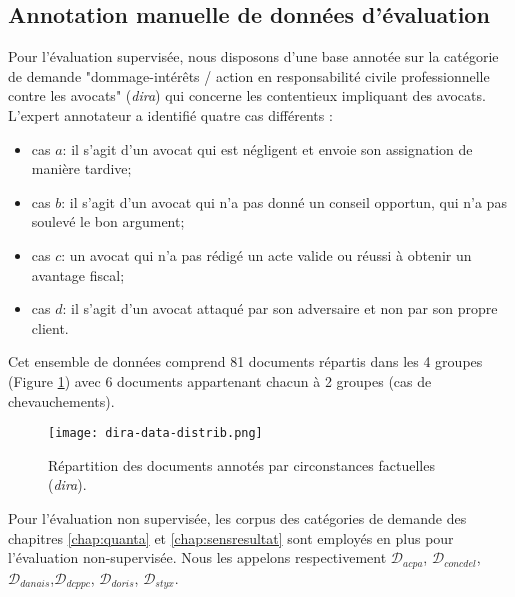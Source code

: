 \subsection{Annotation manuelle de données d'évaluation}
Pour l'évaluation supervisée, nous disposons d'une base annotée sur la catégorie de demande "dommage-intérêts / action en responsabilité civile professionnelle contre les avocats" (\textit{dira}) qui concerne les contentieux impliquant des avocats.  L'expert annotateur a identifié quatre cas différents :
\begin{itemize}
\item cas $a$: il s'agit d'un avocat qui est négligent et envoie son assignation de manière tardive; %
\item cas $b$: il s'agit d'un avocat qui n'a pas donné un conseil opportun, qui n'a pas soulevé le bon argument;
\item cas $c$: un avocat qui n'a pas rédigé un acte valide ou réussi à obtenir un avantage fiscal; %
\item cas $d$: il s'agit d'un avocat attaqué par son adversaire et non par son propre client.
\end{itemize}

Cet ensemble de données comprend 81 documents répartis dans les 4 groupes (Figure \ref{fig:similarite:dira-data-distrib}) avec 6 documents appartenant chacun à 2 groupes (cas de chevauchements).

\begin{figure}[!htb]
	\centering \texttt{[image: dira-data-distrib.png]}
	\caption{Répartition des documents annotés par circonstances factuelles (\textit{dira}).}\label{fig:similarite:dira-data-distrib}
\end{figure}

Pour l'évaluation non supervisée, les corpus des catégories de demande des chapitres \ref{chap:quanta} et \ref{chap:sensresultat} sont employés en plus pour l'évaluation non-supervisée. Nous les appelons respectivement $\mathcal{D}_{acpa}$, $\mathcal{D}_{concdel}$, $\mathcal{D}_{danais}$,$\mathcal{D}_{dcppc}$, $\mathcal{D}_{doris}$, $\mathcal{D}_{styx}$.

